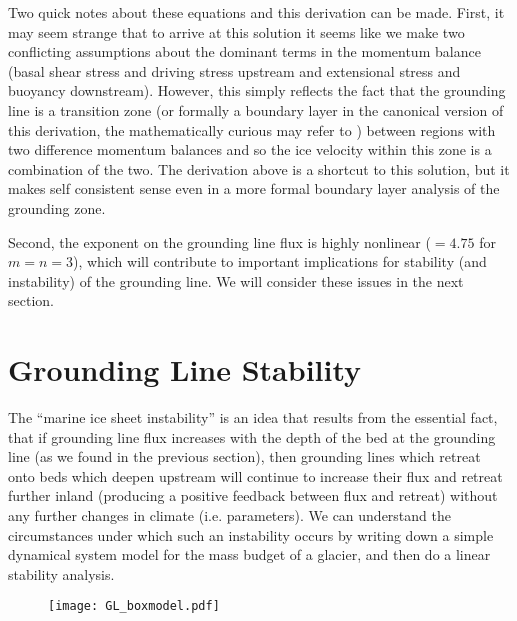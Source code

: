 \documentclass[12pt]{article}
\theoremstyle{definition}
\begin{document}
Two quick notes about these equations and this derivation can be made. First, it may seem strange that to arrive at this solution it seems like we make two conflicting assumptions about the dominant terms in the momentum balance (basal shear stress and driving stress upstream and extensional stress and buoyancy downstream). However, this simply reflects the fact that the grounding line is a transition zone (or formally a boundary layer in the canonical version of this derivation, the mathematically curious may refer to \cite{schoof-2007:marine-pt1}) between regions with two difference momentum balances and so the ice velocity within this zone is a combination of the two. The derivation above is a shortcut to this solution, but it makes self consistent sense even in a more formal boundary layer analysis of the grounding zone.

Second, the exponent on the grounding line flux is highly nonlinear ($=4.75$ for $m=n=3$), which will contribute to important implications for stability (and instability) of the grounding line. We will consider these issues in the next section.

\begin{center}
\end{center}

\section{Grounding Line Stability}

The ``marine ice sheet instability'' is an idea that results from the essential fact, that if grounding line flux increases with the depth of the bed at the grounding line (as we found in the previous section), then grounding lines which retreat onto beds which deepen upstream will continue to increase their flux and retreat further inland (producing a positive feedback between flux and retreat) without any further changes in climate (i.e. parameters). We can understand the circumstances under which such an instability occurs by writing down a simple dynamical system model for the mass budget of a glacier, and then do a linear stability analysis.
\begin{figure}[h]
  \begin{center}
\texttt{[image: GL\_boxmodel.pdf]}
  \end{center}
\end{figure}
\end{document}
